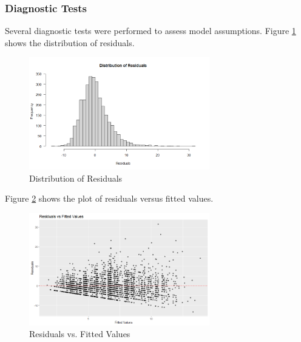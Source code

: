 \documentclass[12pt]{article}
\begin{document}
\subsubsection{Diagnostic Tests}
Several diagnostic tests were performed to assess model assumptions. Figure \ref{fig:residuals} shows the distribution of residuals.

\begin{figure}[H]
\centering
\includegraphics[width=0.7\textwidth]{media/Distribution of Residuals.png}
\caption{Distribution of Residuals}
\label{fig:residuals}
\end{figure}


Figure \ref{fig:residplot} shows the plot of residuals versus fitted values.
\begin{figure}[H]
\centering
\includegraphics[width=0.7\textwidth]{media/Residuals vs. Fitted Values.png}
\caption{Residuals vs. Fitted Values}
\label{fig:residplot}
\end{figure}



\end{document}
